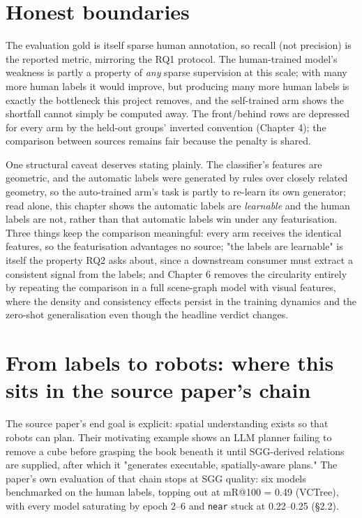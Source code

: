 \section{Honest boundaries}

The evaluation gold is itself sparse human annotation, so recall (not precision) is the reported metric, mirroring the RQ1 protocol. The human-trained model's weakness is partly a property of \textit{any} sparse supervision at this scale; with many more human labels it would improve, but producing many more human labels is exactly the bottleneck this project removes, and the self-trained arm shows the shortfall cannot simply be computed away. The front/behind rows are depressed for every arm by the held-out groups' inverted convention (Chapter 4); the comparison between sources remains fair because the penalty is shared.

One structural caveat deserves stating plainly. The classifier's features are geometric, and the automatic labels were generated by rules over closely related geometry, so the auto-trained arm's task is partly to re-learn its own generator; read alone, this chapter shows the automatic labels are \textit{learnable} and the human labels are not, rather than that automatic labels win under any featurisation. Three things keep the comparison meaningful: every arm receives the identical features, so the featurisation advantages no source; "the labels are learnable" is itself the property RQ2 asks about, since a downstream consumer must extract a consistent signal from the labels; and Chapter 6 removes the circularity entirely by repeating the comparison in a full scene-graph model with visual features, where the density and consistency effects persist in the training dynamics and the zero-shot generalisation even though the headline verdict changes.

\section{From labels to robots: where this sits in the source paper's chain}

The source paper's end goal is explicit: spatial understanding exists so that robots can plan. Their motivating example shows an LLM planner failing to remove a cube before grasping the book beneath it until SGG-derived relations are supplied, after which it "generates executable, spatially-aware plans." The paper's own evaluation of that chain stops at SGG quality: six models benchmarked on the human labels, topping out at mR@100 = 0.49 (VCTree), with every model saturating by epoch 2--6 and \texttt{near} stuck at 0.22--0.25 (\S2.2).

